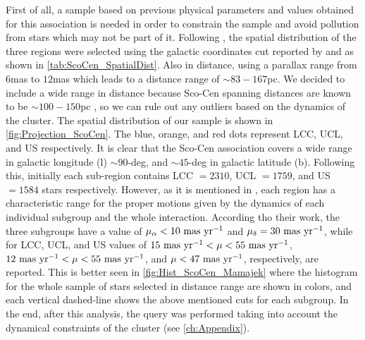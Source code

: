 First of all, a sample based on previous physical parameters and values obtained for this association is needed in order to constrain the sample and avoid pollution from stars which may not be part of it. Following \citeyear{2018MNRAS.tmp..210W}, the spatial distribution of the three regions were selected using the galactic coordinates cut reported by \citeyear{2012yCat..74163108R} and \citeyear{1999AJ....117..354D} as shown in \autoref{tab:ScoCen_SpatialDist}. Also in distance, using a parallax range from $6$mas to $12$mas which leads to a distance range of $\sim 83-167$pc. We decided to include a wide range in distance because Sco-Cen spanning distances are known to be $\sim 100-150$pc \citeyear{2018MNRAS.tmp..210W}, so we can rule out any outliers based on the dynamics of the cluster. The spatial distribution of our sample is shown in \autoref{fig:Projection_ScoCen}. The blue, orange, and red dots represent LCC, UCL, and US respectively. It is clear that the Sco-Cen association covers a wide range in galactic longitude (l) $\sim 90$-deg, and $\sim 45$-deg in galactic latitude (b). Following this, initially each sub-region contains LCC $= 2310$, UCL $= 1759$, and US $= 1584$ stars respectively. However, as it is mentioned in \citeyear{2016MNRAS.461..794P}, each region has a characteristic range for the proper motions given by the dynamics of each individual subgroup and the whole interaction. According tho their work, the three subgroups have a value of $\mu_\alpha < 10~\textnormal{mas}~\textnormal{yr}^{-1}$ and $\mu_\delta = 30~\textnormal{mas}~\textnormal{yr}^{-1}$, while for LCC, UCL, and US values of $15~\textnormal{mas}~\textnormal{yr}^{-1} < \mu < 55~\textnormal{mas}~\textnormal{yr}^{-1}$, $12~\textnormal{mas}~\textnormal{yr}^{-1} < \mu < 55~\textnormal{mas}~\textnormal{yr}^{-1}$, and $\mu < 47~\textnormal{mas}~\textnormal{yr}^{-1}$, respectively, are reported. This is better seen in \autoref{fig:Hist_ScoCen_Mamajek} where the histogram for the whole sample of stars selected in distance range are shown in colors, and each vertical dashed-line shows the above mentioned cuts for each subgroup. In the end, after this analysis, the query was performed taking into account the dynamical constraints of the cluster (see \autoref{ch:Appendix}).\\  

